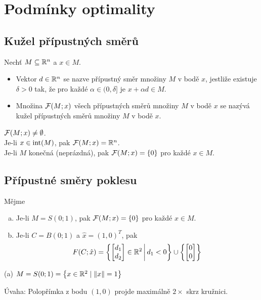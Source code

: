 \section{Podmínky optimality}

\subsection{Kužel přípustných směrů}
Nechť $M \subseteq \mathbb{R}^n$ a $x \in M$.
\begin{itemize}
    \item Vektor $d \in \mathbb{R}^n$ se nazve přípustný směr množiny $M$ v bodě $x$, jestliže existuje $\delta > 0$ tak, že pro
    každé $\alpha \in (0, \delta]$ je $x + \alpha d \in M$.
    \item Množina $\mathcal{F}(M; x)$ všech přípustných směrů množiny $M$ v bodě $x$ se nazývá kužel přípustných směrů množiny
    $M$ v bodě $x$.
\end{itemize}
$\mathcal{F}(M; x) \not = \emptyset$.\\
Je-li $x \in \operatorname*{int}(M)$, pak $\mathcal{F}(M; x) = \mathbb{R}^n$.\\
Je-li $M$ konečná (neprázdná), pak $\mathcal{F}(M;x) = \left\lbrace 0 \right\rbrace$ pro každé $x \in M$.

\subsection{Přípustné směry poklesu}
Mějme
\begin{enumerate}[(a)]
    \item Je-li $M = S(0; 1)$, pak $\mathcal{F}(M;x) = \left\lbrace 0 \right\rbrace$ pro každé $x \in M$.
    \item Je-li $C = B(0; 1)$ a $\hat x = (1, 0)^T$, pak
    \[
        F(C; \hat x) = \left\lbrace 
            \begin{bmatrix}
                d_1 \\
                d_2
            \end{bmatrix} \in \mathbb{R}^2 \, \middle| \, d_1 < 0
         \right\rbrace \cup \left\lbrace 
            \begin{bmatrix}
                0 \\
                0
            \end{bmatrix}
         \right\rbrace
    \]
\end{enumerate}
(a) $M = S(0; 1) = \left\lbrace x \in \mathbb{R}^2 \mid \| x\| = 1 \right\rbrace$

Úvaha: Polopřímka z bodu $(1,0)$ projde maximálně $2 \times$ skrz kružnici.

